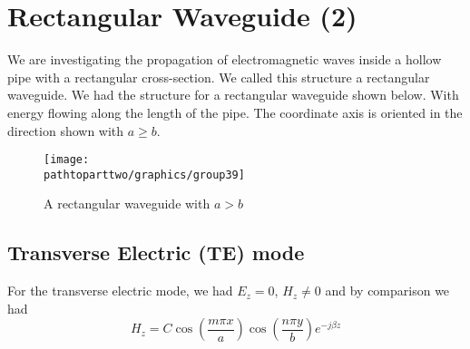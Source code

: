 \chapter{Rectangular Waveguide (2)}

We are investigating the propagation of electromagnetic waves inside a hollow pipe with a rectangular cross-section. We called this structure a rectangular waveguide. We had the structure for a rectangular waveguide shown below. With energy flowing along the length of the pipe. The coordinate axis is oriented in the direction shown with $a\geq b$.
\begin{figure}[h]
\centering
\texttt{[image: \\pathtoparttwo/graphics/group39]}
\caption{A rectangular waveguide with $a>b$}
\end{figure}

\section{Transverse Electric  (TE) mode}
For the transverse electric mode, we had $E_z = 0$, $H_z \neq 0$ and by comparison we had 
\begin{dmath}
H_z = C\cos(\frac{m\pi x}{a}) \cos(\frac{n\pi y}{b})e^{-j\beta z}
\label{eqn:magneticfield}
\end{dmath}

